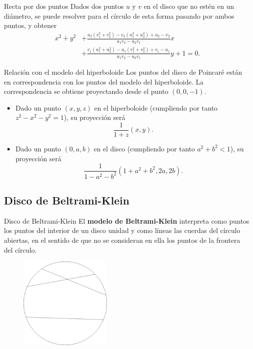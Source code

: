 \documentclass[compress]{beamer}
\begin{document}
\begin{frame}{Recta por dos puntos}
  Dados dos puntos $u$ y $v$ en el disco que no estén en un diámetro, se
  puede resolver para el círculo de esta forma pasando por ambos puntos,
  y obtener
  \[\begin{aligned}
      x^{2}+y^{2} &+{\frac
        {u_{2}(v_{1}^{2}+v_{2}^{2})-v_{2}(u_{1}^{2}+u_{2}^{2})+u_{2}-v_{2}}{u_{1}v_{2}-u_{2}v_{1}}}x\\
      &+{\frac
      {v_{1}(u_{1}^{2}+u_{2}^{2})-u_{1}(v_{1}^{2}+v_{2}^{2})+v_{1}-u_{1}}{u_{1}v_{2}-u_{2}v_{1}}}y+1=0.
    \end{aligned}
  \]
\end{frame}

\begin{frame}{Relación con el modelo del hiperboloide}
  Los puntos del disco de Poincaré están en correspondencia con los puntos del modelo
  del hiperboloide. La correspondencia se obtiene proyectando desde el punto $(0,0,-1)$.

  \begin{itemize}
  \item Dado un punto $(x,y,z)$ en el hiperboloide (cumpliendo por tanto $z^2-x^2-y^2 = 1$),
    su proyección será
    \[\frac{1}{1+z}(x,y).\]
    \pause
  \item Dado un punto $(0,a,b)$ en el disco (cumpliendo por tanto $a^2+b^2 < 1$), su
    proyección será
    \[\frac{1}{1-a^2-b^2}\left(1+a^2+b^2,2a,2b\right).\]
  \end{itemize}
\end{frame}


\subsection{Disco de Beltrami-Klein}

\begin{frame}{Disco de Beltrami-Klein}
  El \textbf{modelo de Beltrami-Klein} interpreta como puntos los puntos
  del interior de un disco unidad y como líneas las cuerdas del círculo
  abiertas, en el sentido de que no se consideran en ella los puntos de
  la frontera del círculo.

  \begin{figure}[ht!]
    \centering
    \includegraphics[width=0.4\textwidth]{beltramiklein.png}
  \end{figure}
\end{frame}
\end{document}
